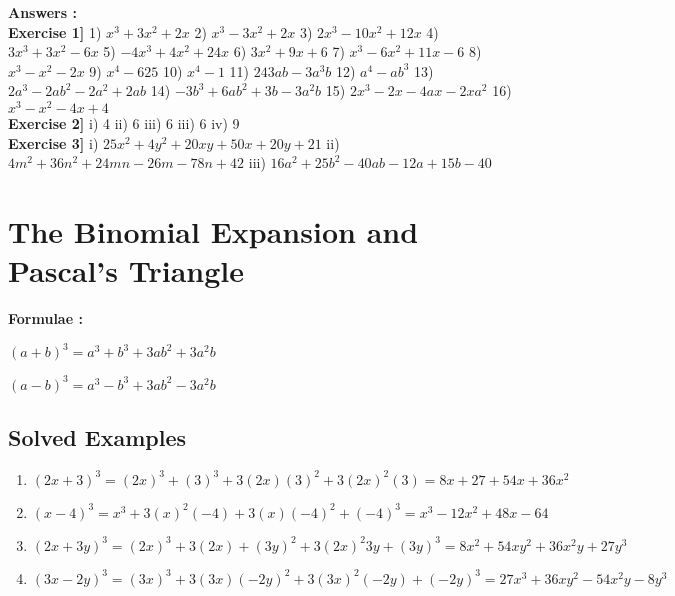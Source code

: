 \documentclass{article}
\begin{document}
{\small \textbf{Answers :}}\\
	{\footnotesize \textbf{Exercise 1]} 1) $x^3+3x^2+2x$} {\footnotesize 2) $x^3-3x^2+2x$} {\footnotesize 3) $2x^3-10x^2+12x$} {\footnotesize 4) $3x^3+3x^2-6x$} {\footnotesize 5) $-4x^3+4x^2+24x$} {\footnotesize 6) $3x^2+9x+6$} {\footnotesize 7) $x^3-6x^2+11x-6$} {\footnotesize 8) $x^3-x^2-2x$} {\footnotesize 9) $x^4-625$} {\footnotesize 10) $x^4-1$} {\footnotesize 11) $243ab-3a^{3}b$} {\footnotesize 12) $a^{4}-ab^{3}$} {\footnotesize 13) $2a^{3}-2ab^{2}-2a^{2}+2ab$} {\footnotesize 14) $-3b^{3}+6ab^{2}+3b-3a^{2}b$} {\footnotesize 15) $2x^{3}-2x-4ax-2xa^{2}$} {\footnotesize 16) $x^{3}-x^{2}-4x+4$}\\
	{\footnotesize \textbf{Exercise 2]} i) 4} {\footnotesize ii) 6} {\footnotesize iii) 6} {\footnotesize iii) 6} {\footnotesize iv) 9}\\
	{\footnotesize \textbf{Exercise 3]} i) $25x^{2}+4y^{2}+20xy+50x+20y+21$} {\footnotesize ii) $4m^{2}+36n^{2}+24mn-26m-78n+42$} {\footnotesize iii) $16a^{2}+25b^{2}-40ab-12a+15b-40$}
\section{The Binomial Expansion and Pascal's Triangle}

\hspace*{10mm}\textbf{Formulae :}
\begin{center}
	{\boldmath$(a+b)^{3}=a^{3}+b^{3}+3ab^{2}+3a^{2}b$}
	
	{\boldmath$(a-b)^{3}=a^{3}-b^{3}+3ab^{2}-3a^{2}b$}
\end{center}
\subsection{Solved Examples}
\begin{enumerate}
	\item $(2x+3)^{3} = (2x)^{3}+(3)^{3}+3(2x)(3)^{2}+3(2x)^{2}(3) = 8x+27+54x+36x^{2}$
	\item $(x-4)^{3} = x^{3}+3(x)^{2}(-4)+3(x)(-4)^{2}+(-4)^{3} = x^{3}-12x^{2}+48x-64$
	\item $(2x+3y)^{3} = (2x)^{3}+3(2x)+(3y)^{2}+3(2x)^{2} 3y+(3y)^{3} = 8x^{2}+54xy^{2}+36x^{2}y+27y^{3}$
	\item $(3x-2y)^{3} = (3x)^{3}+3(3x)(-2y)^{2}+3(3x)^{2}(-2y)+(-2y)^{3} = 27x^{3}+36xy^{2}-54x^{2}y-8y^{3}$
\end{enumerate}
\end{document}
